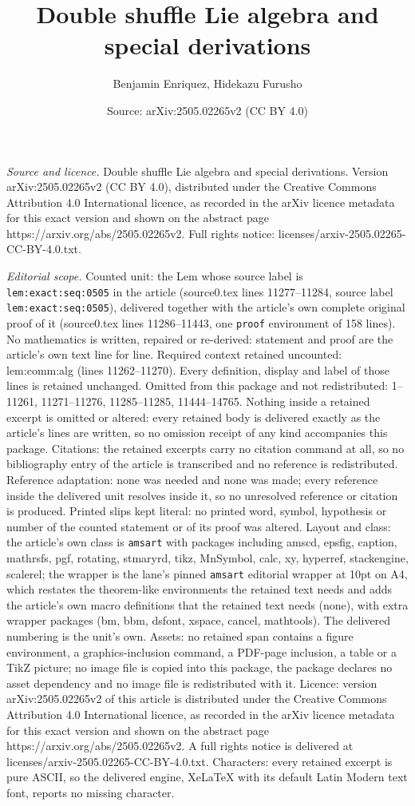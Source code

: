 \documentclass[10pt,a4paper]{amsart}
\title[Double shuffle Lie algebra and special derivations]{Double shuffle Lie algebra and special derivations}
\author{Benjamin Enriquez, Hidekazu Furusho}
\date{Source: arXiv:2505.02265v2 (CC BY 4.0)}
\begin{document}
\maketitle

\noindent\emph{Source and licence.} Double shuffle Lie algebra and special derivations. Version arXiv:2505.02265v2 (CC BY 4.0), distributed under the Creative Commons Attribution 4.0 International licence, as recorded in the arXiv licence metadata for this exact version and shown on the abstract page https://arxiv.org/abs/2505.02265v2. Full rights notice: licenses/arxiv-2505.02265-CC-BY-4.0.txt.\par\smallskip

\noindent\textit{Editorial scope.} Counted unit: the Lem whose source label is \texttt{lem:exact:seq:0505} in the article (source0.tex lines 11277--11284, source label \texttt{lem:exact:seq:0505}), delivered together with the article's own complete original proof of it (source0.tex lines 11286--11443, one \texttt{proof} environment of 158 lines). No mathematics is written, repaired or re-derived: statement and proof are the article's own text line for line. Required context retained uncounted: lem:comm:alg (lines 11262--11270). Every definition, display and label of those lines is retained unchanged. Omitted from this package and not redistributed: 1--11261, 11271--11276, 11285--11285, 11444--14765. Nothing inside a retained excerpt is omitted or altered: every retained body is delivered exactly as the article's lines are written, so no omission receipt of any kind accompanies this package. Citations: the retained excerpts carry no citation command at all, so no bibliography entry of the article is transcribed and no reference is redistributed. Reference adaptation: none was needed and none was made; every reference inside the delivered unit resolves inside it, so no unresolved reference or citation is produced. Printed slips kept literal: no printed word, symbol, hypothesis or number of the counted statement or of its proof was altered. Layout and class: the article's own class is \texttt{amsart} with packages including amscd, epsfig, caption, mathrsfs, pgf, rotating, stmaryrd, tikz, MnSymbol, calc, xy, hyperref, stackengine, scalerel; the wrapper is the lane's pinned \texttt{amsart} editorial wrapper at 10pt on A4, which restates the theorem-like environments the retained text needs and adds the article's own macro definitions that the retained text needs (none), with extra wrapper packages (bm, bbm, dsfont, xspace, cancel, mathtools). The delivered numbering is the unit's own. Assets: no retained span contains a figure environment, a graphics-inclusion command, a PDF-page inclusion, a table or a TikZ picture; no image file is copied into this package, the package declares no asset dependency and no image file is redistributed with it. Licence: version arXiv:2505.02265v2 of this article is distributed under the Creative Commons Attribution 4.0 International licence, as recorded in the arXiv licence metadata for this exact version and shown on the abstract page https://arxiv.org/abs/2505.02265v2. A full rights notice is delivered at licenses/arxiv-2505.02265-CC-BY-4.0.txt. Characters: every retained excerpt is pure ASCII, so the delivered engine, XeLaTeX with its default Latin Modern text font, reports no missing character.
\end{document}
